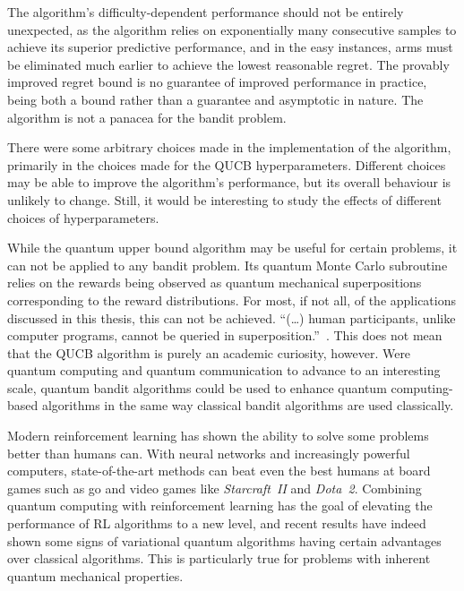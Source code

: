 The algorithm's difficulty-dependent performance should not be entirely unexpected, as the algorithm relies on exponentially many consecutive samples to achieve its superior predictive performance, and in the easy instances, arms must be eliminated much earlier to achieve the lowest reasonable regret.
The provably improved regret bound is no guarantee of improved performance in practice, being both a bound rather than a guarantee and asymptotic in nature.
The algorithm is not a panacea for the bandit problem.

There were some arbitrary choices made in the implementation of the algorithm, primarily in the choices made for the QUCB hyperparameters.
Different choices may be able to improve the algorithm's performance, but its overall behaviour is unlikely to change.
Still, it would be interesting to study the effects of different choices of hyperparameters.

While the quantum upper bound algorithm may be useful for certain problems, it can not be applied to any bandit problem.
Its quantum Monte Carlo subroutine relies on the rewards being observed as quantum mechanical superpositions corresponding to the reward distributions.
For most, if not all, of the applications discussed in this thesis\footnotemark, this can not be achieved.
\enquote{(\dots) human participants, unlike computer programs, cannot be queried in superposition.}~\autocite{wang2021}.
This does not mean that the QUCB algorithm is purely an academic curiosity, however.
Were quantum computing and quantum communication to advance to an interesting scale, quantum bandit algorithms could be used to enhance quantum computing-based algorithms in the same way classical bandit algorithms are used classically.


Modern reinforcement learning has shown the ability to solve some problems better than humans can.
With neural networks and increasingly powerful computers, state-of-the-art methods can beat even the best humans at board games such as go and video games like \textit{Starcraft~II} and \textit{Dota~2}.
Combining quantum computing with reinforcement learning has the goal of elevating the performance of RL algorithms to a new level, and recent results have indeed shown some signs of variational quantum algorithms having certain advantages over classical algorithms.
This is particularly true for problems with inherent quantum mechanical properties.

